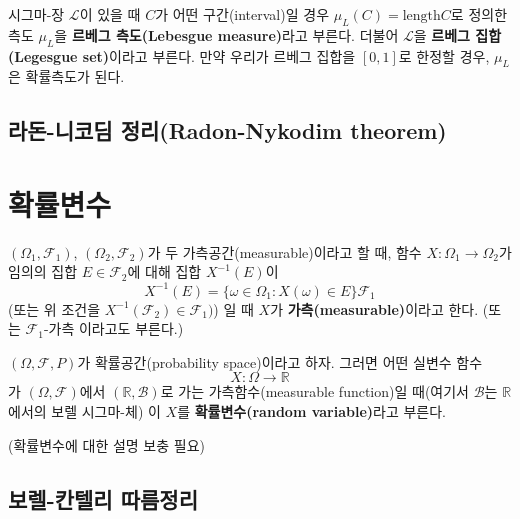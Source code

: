\documentclass[b5paper,]{scrbook}
\theoremstyle{plain}
\theoremstyle{definition}
\numberwithin{equation}{section}
\let\BeginKnitrBlock\begin \let\EndKnitrBlock\end
\begin{document}
\BeginKnitrBlock{definition}[르베그 측도]
\protect\hypertarget{def:unnamed-chunk-56}{}{\label{def:unnamed-chunk-56}
{} }시그마-장 \(\mathcal{L}\)이 있을 때
\(C\)가 어떤 구간(interval)일 경우 \(\mu_{L}(C)=\text{length}C\)로
정의한 측도 \(\mu_{L}\)을 \textbf{르베그 측도(Lebesgue measure)}라고
부른다. 더불어 \(\mathcal{L}\)을 \textbf{르베그 집합(Legesgue
set)}이라고 부른다. 만약 우리가 르베그 집합을 \([0,1]\)로 한정할 경우,
\(\mu_{L}\)은 확률측도가 된다.
\EndKnitrBlock{definition}

\section{라돈-니코딤 정리(Radon-Nykodim
theorem)}\label{--radon-nykodim-theorem}

\chapter{확률변수}\label{rv}

\BeginKnitrBlock{definition}[가측]
\protect\hypertarget{def:unnamed-chunk-57}{}{\label{def:unnamed-chunk-57}
{} }\((\Omega_{1}, \mathcal{F}_{1})\),
\((\Omega_{2}, \mathcal{F}_{2})\)가 두 가측공간(measurable)이라고 할 때,
함수 \(X:\Omega_{1} \rightarrow \Omega_{2}\)가 임의의 집합
\(E\in \mathcal{F}_{2}\)에 대해 집합 \(X^{-1}(E)\)이
\[X^{-1}(E)=\{ \omega \in \Omega_{1}: X(\omega) \in E\} \mathcal{F}_{1}\]
(또는 위 조건을 \(X^{-1}(\mathcal{F}_{2})\in \mathcal{F}_{1})\)) 일 때
\(X\)가 \textbf{가측(measurable)}이라고 한다. (또는
\(\mathcal{F}_{1}\)-가측 이라고도 부른다.)
\EndKnitrBlock{definition}

\BeginKnitrBlock{definition}[확률변수]
\protect\hypertarget{def:unnamed-chunk-58}{}{\label{def:unnamed-chunk-58}
{} }\((\Omega, \mathcal{F}, P)\)가
확률공간(probability space)이라고 하자. 그러면 어떤 실변수 함수
\[X:\Omega \rightarrow \mathbb{R}\] 가 \((\Omega, \mathcal{F})\)에서
\((\mathbb{R}, \mathcal{B})\)로 가는 가측함수(measurable function)일
때(여기서 \(\mathcal{B}\)는 \(\mathbb{R}\)에서의 보렐 시그마-체) 이
\(X\)를 \textbf{확률변수(random variable)}라고 부른다.
\EndKnitrBlock{definition}

(확률변수에 대한 설명 보충 필요)

\section{보렐-칸텔리 따름정리}\label{--}
\end{document}
